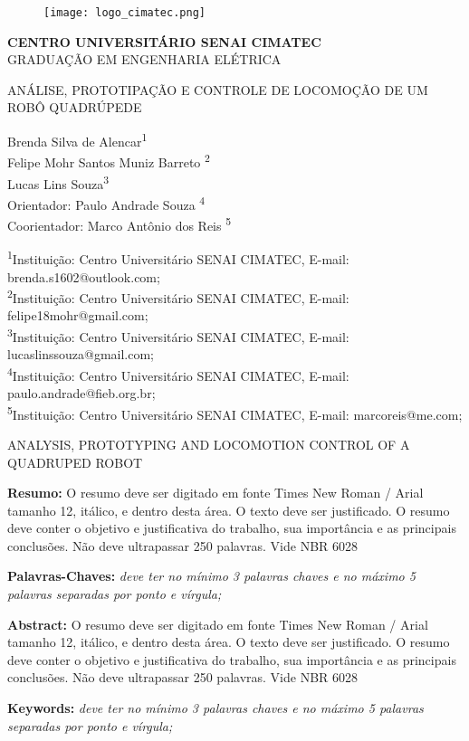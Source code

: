 \documentclass[../main.tex]{subfiles}
\makeatletter
\renewcommand\maketitle{
    \begin{figure}[t]
        \centering
        \texttt{[image: logo\_cimatec.png]}
    \end{figure}
    
    \begin{center}
        \textbf{\MakeUppercase{Centro Universitário Senai Cimatec}}
        \\
        \MakeUppercase{Graduação em Engenharia Elétrica}
        
        \vspace{\baselineskip}
        
        \begin{large}
          \MakeUppercase{Análise, prototipação e controle de locomoção de um robô quadrúpede}
        \end{large}
    \end{center}

    \begin{flushright}
        Brenda Silva de Alencar\textsuperscript{1}\\
        Felipe Mohr Santos Muniz Barreto \textsuperscript{2}\\
        Lucas Lins Souza\textsuperscript{3}\\
        Orientador: Paulo Andrade Souza \textsuperscript{4}\\
        Coorientador: Marco Antônio dos Reis \textsuperscript{5}\\
    \end{flushright}
    \begin{flushleft}
      \begin{small}
          \textsuperscript{1}Instituição: Centro Universitário SENAI CIMATEC, E-mail: brenda.s1602@outlook.com;\\
          \textsuperscript{2}Instituição: Centro Universitário SENAI CIMATEC, E-mail: felipe18mohr@gmail.com;\\
          \textsuperscript{3}Instituição: Centro Universitário SENAI CIMATEC, E-mail: lucaslinssouza@gmail.com;\\
          \textsuperscript{4}Instituição: Centro Universitário SENAI CIMATEC, E-mail: paulo.andrade@fieb.org.br;\\
          \textsuperscript{5}Instituição: Centro Universitário SENAI CIMATEC, E-mail: marcoreis@me.com;\\      
      \end{small}
    \end{flushleft}

    \begin{center}
      \begin{large}
        \MakeUppercase{Analysis, prototyping and locomotion control of a quadruped robot}
      \end{large}
    \end{center}

    \noindent\textbf{Resumo:} 
      O resumo deve ser digitado em fonte Times New Roman / Arial tamanho 12,  itálico, e dentro desta área. O texto deve ser justificado. O resumo deve conter o objetivo  e  justificativa  do  trabalho,  sua  importância  e  as  principais  conclusões.  Não  deve  ultrapassar 250 palavras. Vide NBR 6028

    \noindent\textbf{Palavras-Chaves:} 
      \textit{deve  ter  no  mínimo  3  palavras  chaves  e  no  máximo  5  palavras  separadas por ponto e vírgula;}

    \vspace{\baselineskip}
      
    \noindent\textbf{Abstract:} 
      O resumo deve ser digitado em fonte Times New Roman / Arial tamanho 12,  itálico, e dentro desta área. O texto deve ser justificado. O resumo deve conter o objetivo  e  justificativa  do  trabalho,  sua  importância  e  as  principais  conclusões.  Não  deve  ultrapassar 250 palavras. Vide NBR 6028
    
    \noindent\textbf{Keywords:} 
      \textit{deve  ter  no  mínimo  3  palavras  chaves  e  no  máximo  5  palavras  separadas por ponto e vírgula;}
    
}
\makeatother
\begin{document}
    \onecolumn
    \maketitle
    \newpage
    \twocolumn
\end{document}
